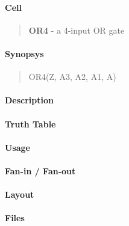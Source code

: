 \label{OR4}
\paragraph{Cell}
\begin{quote}
    \textbf{OR4} - a 4-input OR gate
\end{quote}

\paragraph{Synopsys}
\begin{quote}
    OR4(Z, A3, A2, A1, A)
\end{quote}

\paragraph{Description}

%

\paragraph{Truth Table}
%

\paragraph{Usage}

\paragraph{Fan-in / Fan-out}

\paragraph{Layout}

\paragraph{Files}

\clearpage

